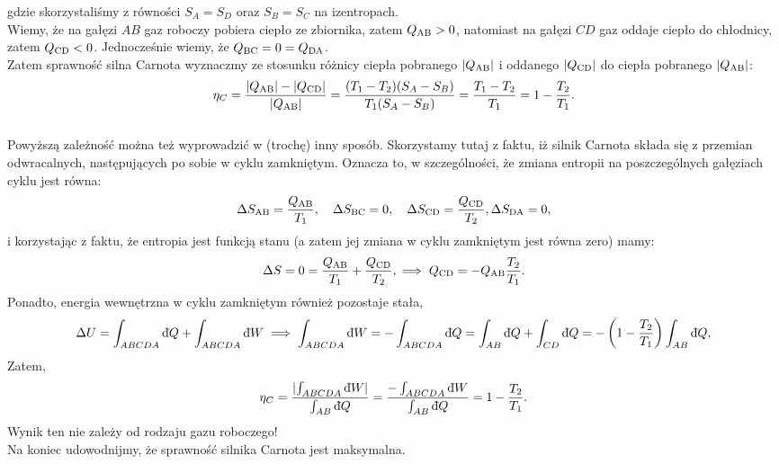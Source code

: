 \documentclass[11pt,a4paper]{article}
\newcommand{\dbar}{{\mkern3mu\mathchar'26\mkern-12mu d}}
\begin{document}
gdzie skorzystaliśmy z równości $S_A=S_D$ oraz $S_B=S_C$ na izentropach.  \\
Wiemy, że na gałęzi $AB$ gaz roboczy pobiera ciepło ze zbiornika, zatem $Q_{\rm {AB}} >0$, natomiast na gałęzi $CD$ gaz oddaje ciepło do chłodnicy, zatem $Q_{\rm {CD}} <0$. Jednocześnie wiemy, że $Q_{\rm {BC}}=0=Q_{\rm {DA}}$.  \\
Zatem sprawność silna Carnota wyznaczmy ze stosunku różnicy ciepła pobranego $\lvert Q_{\rm {AB}} \rvert$ i oddanego $\lvert Q_{\rm {CD}} \rvert$ do ciepła pobranego  $\lvert Q_{\rm {AB} }\rvert$:
\begin{align}
\eta_C = \frac{\lvert Q_{\rm {AB}} \rvert- \lvert Q_{\rm {CD}} \rvert}{\lvert Q_{\rm {AB}} \rvert} = \frac{(T_1 -T_2)(S_A-S_B)}{T_1(S_A-S_B)} = \frac{T_1-T_2}{T_1}= 1 - \frac{T_2}{T_1}.
\end{align}
\\
Powyższą zależność można też wyprowadzić w (trochę) inny sposób.  Skorzystamy tutaj z faktu, iż silnik Carnota składa się z przemian odwracalnych, następujących po sobie w cyklu zamkniętym. Oznacza to, w szczególności, że zmiana entropii na poszczególnych gałęziach cyklu jest równa:
\begin{align}
\Delta S_{\rm AB} = \frac{Q_{\rm AB}}{T_1} , \quad 
\Delta S_{\rm BC} =  0, \quad \Delta S_{\rm CD} = \frac{Q_{\rm CD}}{T_2}, \Delta S_{\rm DA} = 0,
\end{align}
i korzystając z faktu, że entropia jest funkcją stanu (a zatem jej zmiana w cyklu zamkniętym jest równa zero) mamy:
\begin{align}
\Delta S = 0 =  \frac{Q_{\rm AB}}{T_1}  +  \frac{Q_{\rm CD}}{T_2}, \implies  Q_{\rm CD} =- Q_{\rm AB} \frac{T_2}{T_1}.
\end{align}
Ponadto, energia wewnętrzna w cyklu zamkniętym również pozostaje stała,
\begin{align}
\Delta U = \int_{ABCDA}{\rm \dbar}Q + \int_{ABCDA}{\rm \dbar}W  \implies  \int_{ABCDA}{\rm \dbar}W  = -  \int_{ABCDA}{\rm \dbar}Q=\int_{AB}{\rm \dbar}Q + \int_{CD}{\rm \dbar}Q = - \left(1-\frac{T_2}{T_1} \right)\int_{AB} {\rm \dbar}Q ,
\end{align}
Zatem,
\begin{align}
\eta_C= \frac{\lvert \int_{ABCDA}{\rm \dbar}W \rvert}{\int_{AB}{\rm \dbar }Q} = \frac{-\int_{ABCDA}{\rm \dbar}W }{\int_{AB}{\rm \dbar}Q} = 1- \frac{T_2}{T_1}.
\end{align}
Wynik ten nie zależy od rodzaju gazu roboczego!\\
Na koniec udowodnijmy, że sprawność silnika Carnota jest maksymalna. 
\end{document}
